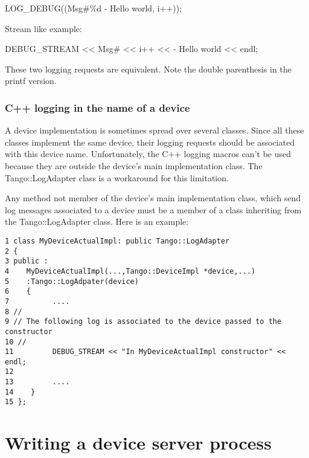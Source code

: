 LOG\_DEBUG((\textquotedbl{}Msg\#\%d - Hello world\textquotedbl{},
i++));



Stream like example:



DEBUG\_STREAM <\textcompwordmark{}< \textquotedbl{}Msg\#\textquotedbl{}
<\textcompwordmark{}< i++ <\textcompwordmark{}< \textquotedbl{}- Hello
world\textquotedbl{} <\textcompwordmark{}< endl;   



These two logging requests are equivalent. Note the double parenthesis
in the printf version.


\subsubsection{C++ logging in the name of a device}
\label{sub:C++-logging-in}

A device implementation is sometimes spread over several classes.
Since all these classes implement the same device, their logging requests
should be associated with this device name. Unfortunately, the C++
logging macros can't be used because they are outside the device's
main implementation class. The Tango::LogAdapter class is a workaround
for this limitation.

Any method not member of the device's main implementation class, which
send log messages associated to a device must be a member of a class
inheriting from the Tango::LogAdapter class. Here is an example:


\begin{verbatim}
1 class MyDeviceActualImpl: public Tango::LogAdapter
2 {
3 public :
4    MyDeviceActualImpl(...,Tango::DeviceImpl *device,...)
5    :Tango::LogAdpater(device)
6    {
7          ....
8 //
9 // The following log is associated to the device passed to the constructor
10 //
11         DEBUG_STREAM << "In MyDeviceActualImpl constructor" << endl;
12 
13         ....
14    }
15 };
\end{verbatim}



\section{Writing a device server process}
\label{Writing_chapter}

